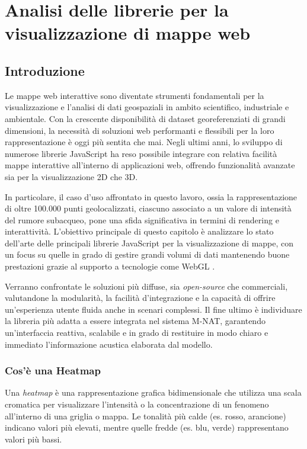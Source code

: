 \chapter{Analisi delle librerie per la visualizzazione di mappe web}

\section{Introduzione}
Le mappe web interattive sono diventate strumenti fondamentali per la
visualizzazione e l'analisi di dati geospaziali in ambito scientifico, industriale
e ambientale. Con la crescente disponibilità di dataset georeferenziati di
grandi dimensioni, la necessità di soluzioni web performanti e flessibili per la
loro rappresentazione è oggi più sentita che mai. Negli ultimi anni, lo sviluppo
di numerose librerie JavaScript ha reso possibile integrare con relativa facilità
mappe interattive all'interno di applicazioni web, offrendo funzionalità
avanzate sia per la visualizzazione 2D che 3D.

In particolare, il caso d'uso affrontato in questo lavoro, ossia la
rappresentazione di oltre 100.000 punti geolocalizzati, ciascuno associato a un valore
di intensità del rumore subacqueo, pone una sfida significativa in termini di
rendering e interattività. L'obiettivo principale di questo capitolo è analizzare
lo stato dell'arte delle principali librerie JavaScript per la visualizzazione di
mappe, con un focus su quelle in grado di gestire grandi volumi di dati
mantenendo buone prestazioni grazie al supporto a tecnologie come WebGL
\cite{mapbox-gl-js}.

Verranno confrontate le soluzioni più diffuse, sia \textit{open-source} che
commerciali, valutandone la modularità, la facilità d'integrazione e la capacità
di offrire un'esperienza utente fluida anche in scenari complessi. Il fine ultimo
è individuare la libreria più adatta a essere integrata nel sistema M-NAT,
garantendo un'interfaccia reattiva, scalabile e in grado di restituire in modo chiaro
e immediato l'informazione acustica elaborata dal modello.

\subsection{Cos'è una Heatmap}
Una \emph{heatmap} è una rappresentazione grafica bidimensionale che utilizza
una scala cromatica per visualizzare l'intensità o la concentrazione di un
fenomeno all'interno di una griglia o mappa. Le tonalità più calde (es. rosso,
arancione) indicano valori più elevati, mentre quelle fredde (es. blu, verde)
rappresentano valori più bassi.

